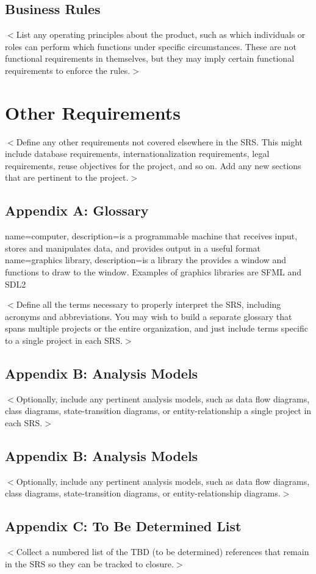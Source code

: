 \documentclass{scrreprt}
\begin{document}
\section{Business Rules}
$<$List any operating principles about the product, such as which individuals or 
roles can perform which functions under specific circumstances. These are not 
functional requirements in themselves, but they may imply certain functional 
requirements to enforce the rules.$>$


\chapter{Other Requirements}
$<$Define any other requirements not covered elsewhere in the SRS. This might 
include database requirements, internationalization requirements, legal 
requirements, reuse objectives for the project, and so on. Add any new sections 
that are pertinent to the project.$>$

\section{Appendix A: Glossary}

{
  name=computer,
  description={is a programmable machine that receives input,
               stores and manipulates data, and provides
               output in a useful format}
}
{
  name=graphics library,
  description={is a library the provides a window and functions to draw to the window.  Examples of graphics libraries are SFML and SDL2}
}


\renewcommand{\glossarysection}[2][]{} %
\printglossaries

$<$Define all the terms necessary to properly interpret the SRS, including 
acronyms and abbreviations. You may wish to build a separate glossary that spans 
multiple projects or the entire organization, and just include terms specific to 
a single project in each SRS.$>$

\section{Appendix B: Analysis Models}
$<$Optionally, include any pertinent analysis models, such as data flow 
diagrams, class diagrams, state-transition diagrams, or entity-relationship 
a single project in each SRS.$>$

\section{Appendix B: Analysis Models}
$<$Optionally, include any pertinent analysis models, such as data flow 
diagrams, class diagrams, state-transition diagrams, or entity-relationship 
diagrams.$>$

\section{Appendix C: To Be Determined List}
$<$Collect a numbered list of the TBD (to be determined) references that remain 
in the SRS so they can be tracked to closure.$>$
\end{document}
